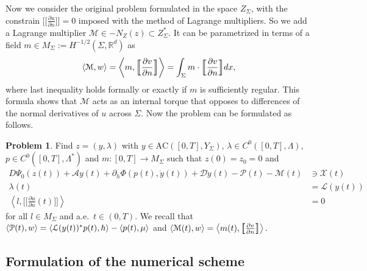 \documentclass[a4paper,10pt,oneside]{amsbook}
\numberwithin{section}{chapter}
\numberwithin{equation}{chapter}
\theoremstyle{definition}
\newtheorem{prb}[prop]{Problem}
\DeclarePairedDelimiter{\dual}{\langle}{\rangle}
\newcommand{\dind}[2]{\frac{\partial #1}{\partial #2}}
\begin{document}
Now we consider the original problem formulated in the space $Z_\Sigma$, with the constrain $\big[\!\!\big[\dind{u}{n}\big]\!\!\big]=0$ imposed with the method of Lagrange multipliers. So we add a Lagrange multiplier $\mathcal{M}\in -N_Z(z)\subset Z^*_\Sigma$. It can be parametrized in terms of a field $m\in M_\Sigma:=H^{-1/2}(\Sigma,\mathbb{R}^d)$ as
\[
\dual{\mathcal{M},w}=\left\langle m,\Big[\!\!\Big[\dind{v}{n}\Big]\!\!\Big]\right\rangle=\int_\Sigma m\cdot\Big[\!\!\Big[\dind{v}{n}\Big]\!\!\Big]dx,
\]
where last inequality holds formally or exactly if $m$ is sufficiently regular. This formula shows that $\mathcal{M}$ acts as an internal torque that opposes to differences of the normal derivatives of $u$ across $\Sigma$. Now the problem can be formulated as follows.
\begin{prb}
\label{prb:reformulated}
Find $z=(y,\lambda)$ with $y\in\text{AC}([0,T],Y_\Sigma)$, $\lambda\in C^0([0,T],\Lambda)$, $p\in C^0([0,T],\Lambda^*)$ and $m\colon[0,T]\to M_\Sigma$ such that $z(0)=z_0=0$ and
\begin{align}
D\Psi_0(z(t))+\mathcal{A}y(t)+\partial_h\Phi(p(t),\dot y(t))+\mathcal{D}\dot y(t)-\mathcal{P}(t)-\mathcal{M}(t)&\ni\mathcal{X}(t) \\
\lambda(t)&=\mathcal{L}(y(t)) \\
\left\langle l,\Big[\!\!\Big[\dind{u}{n}(t)\Big]\!\!\Big]\right\rangle&=0
\end{align}
for all $l\in M_\Sigma$ and a.e.\ $t\in(0,T)$. We recall that $\dual{\mathcal{P}(t),w}=\dual{\mathcal{L}(y(t))^*p(t),h}-\dual{p(t),\mu}$ and $\dual{\mathcal{M}(t),w}=\left\langle m(t),\big[\!\!\big[\dind{v}{n}\big]\!\!\big]\right\rangle.$
\end{prb}

\subsection{Formulation of the numerical scheme}
\label{subsec:scheme}
\end{document}
